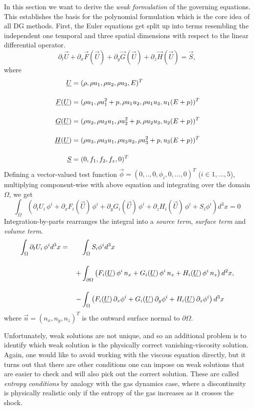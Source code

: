 In this section we want to derive the \emph{weak formulation} of the governing
equations. This establishes the basis for the polynomial formulation which is
the core idea of all DG methods.  First, the Euler equations get split up into
terms resembling the independent one temporal and three spatial
dimensions with respect to the linear differential operator.
\begin{equation}
\partial_t \vec{U} + \partial_x\vec{F}(\vec{U})+ \partial_y\vec{G}(\vec{U}) + \partial_z\vec{H}(\vec{U}) = \vec{S},
\end{equation}
where
\begin{align}
    \vec{U} &= (\dens, \dens\vels_1, \dens\vels_2, \dens\vels_3, \Ener)^T\br
    \vec{F}(\vec{U}) &= (\dens\vels_1, \dens\vels_1^2 + \pres, \dens\vels_1\vels_2, \dens\vels_1\vels_3, \vels_1(\Ener + \pres))^T\br
    \vec{G}(\vec{U}) &= (\dens\vels_2, \dens\vels_2\vels_1, \dens\vels_2^2 + \pres, \dens\vels_2\vels_3, \vels_2(\Ener + \pres))^T\br
    \vec{H}(\vec{U}) &= (\dens\vels_3, \dens\vels_3\vels_1, \dens\vels_3\vels_2, \dens\vels_3^2 + \pres, \vels_3(\Ener + \pres))^T\br
    \vec{S} &= (0,f_1,f_2,f_z,0)^T
\end{align}
Defining a vector-valued test function $\vec{\phi} = (0,..,0,\phi_i,0,...,0)^T$
($i\in{1,...,5}$), multiplying component-wise with above equation and
integrating over the domain $\Omega$, we get
\begin{equation}
    \int_\Omega \left( \partial_tU_i\,\phi^i 
        + \partial_x F_i(\vec{U})\,\phi^i 
        + \partial_y G_i(\vec{U})\,\phi^i 
        + \partial_z H_i(\vec{U})\,\phi^i + S_i \phi^i \right) d^3x = 0
\end{equation}
Integration-by-parts rearranges the integral into a \emph{source term},
\emph{surface term} and \emph{volume term}.
\begin{align}
\label{eqn:weak-formulation}
    \int_\Omega \partial_t U_i\,\phi^i d^3x = \;\;\;\;\;\;\;&\int_\Omega S_i \phi^i d^3x \br
    +& \int_{\partial\Omega} \left(F_i(\vec{U})\,\phi^i\,n_x + G_i(\vec{U})\,\phi^i\,n_z + H_i(\vec{U})\,\phi^i\,n_z \right) d^2x,\nonumber \br
    -& \int_\Omega \left(F_i(\vec{U})\,\partial_x \phi^i + G_i(\vec{U})\,\partial_y \phi^i + H_i(\vec{U})\,\partial_z \phi^i \right) d^3x
\end{align}
where $\vec{n} = (n_x,n_y,n_z)^T$ is the outward surface normal to $\partial\Omega$.

Unfortunately, weak solutions are not unique, and so an additional problem is
to identify which weak solution is the physically correct vanishing-viscosity
solution. Again, one would like to avoid working with the viscous equation
directly, but it turns out that there are other conditions one can impose on
weak solutions that are easier to check and will also pick out the correct
solution. These are called \emph{entropy conditions} by analogy with the gas
dynamics case, where a discontinuity is physically realistic only if the
entropy of the gas increases as it crosses the shock.
